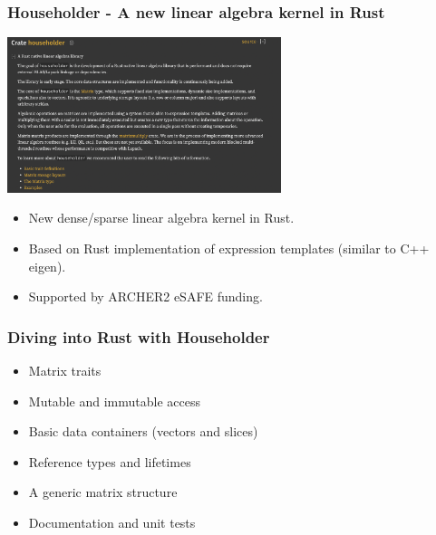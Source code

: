 \documentclass[dvipsnames,10pt]{beamer}
\begin{document}
\begin{frame}
\frametitle{Householder - A new linear algebra kernel in Rust}

\begin{center}
\includegraphics[width=8cm]{../figs/householder}
\end{center}

\begin{itemize}
\item New dense/sparse linear algebra kernel in Rust.
\item Based on Rust implementation of expression templates (similar to C++ eigen).
\item Supported by ARCHER2 eSAFE funding.
\end{itemize}

\end{frame}

\begin{frame}
\frametitle{Diving into Rust with Householder}

\begin{itemize}
\item Matrix traits
\item Mutable and immutable access
\item Basic data containers (vectors and slices)
\item Reference types and lifetimes
\item A generic matrix structure
\item Documentation and unit tests
\end{itemize}

\end{frame}
\end{document}
